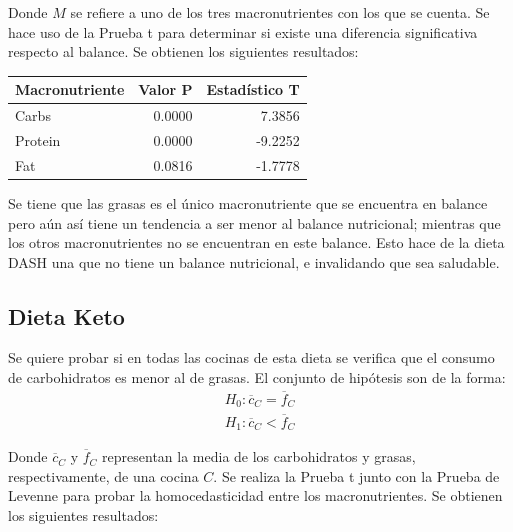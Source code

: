 \documentclass[12pt,a4paper]{article}
\begin{document}
{{            Donde $M$ se refiere a uno de los tres macronutrientes con los que 
            se cuenta. Se hace uso de la Prueba t para determinar si existe 
            una diferencia significativa respecto al balance. Se obtienen 
            los siguientes resultados:

            \begin{center}
                \begin{tabular}{l|rr}
                \toprule
                    Macronutriente & Valor P & Estadístico T \\
                \midrule
                    Carbs   & 0.0000 &  7.3856 \\
                    Protein & 0.0000 & -9.2252 \\
                    Fat     & 0.0816 & -1.7778 \\
                \bottomrule
                \end{tabular}
            \end{center}

            Se tiene que las grasas es el único macronutriente que se encuentra en 
            balance pero aún así tiene un tendencia a ser menor al balance nutricional; 
            mientras que los otros macronutrientes no se encuentran en este balance.
             Esto hace 
            de la dieta DASH una que no tiene un balance nutricional, e invalidando que 
            sea saludable.
        }

        \subsection{Dieta Keto}
        {
            Se quiere probar si en todas las cocinas de esta dieta 
            se verifica que el consumo de carbohidratos es menor al de grasas. 
            El conjunto de hipótesis son de la forma:
            \begin{align*}
                H_0 : \overline{c}_C = \overline{f}_C \\
                H_1 : \overline{c}_C < \overline{f}_C
            \end{align*}

            Donde $\overline{c}_C$ y $\overline{f}_C$ representan 
            la media de los carbohidratos y grasas, respectivamente, de 
            una cocina $C$. Se realiza la Prueba t junto con la Prueba de Levenne para 
            probar la homocedasticidad entre los macronutrientes. Se 
            obtienen los siguientes resultados:

}}
\end{document}
